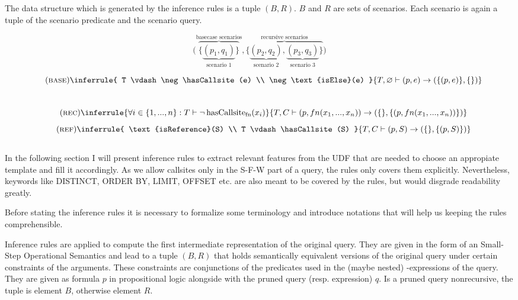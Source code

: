 The data structure which is generated by the inference rules is a tuple $(B, R)$. $B$ and $R$ are sets of scenarios. Each scenario is again a tuple of the scenario predicate and the scenario query.

$$
\Big(
    \overbrace{\big\{
        \underbrace{
            (p_1, q_1)
        }_{\text{scenario 1}}
    \big\}}^{\text{basecase scenarios}}
    ,
    \overbrace{\big\{
        \underbrace{
            (p_2, q_2)
        }_{\text{scenario 2}},
        \underbrace{
            (p_3, q_3)
        }_{\text{scenario 3}}
    \big\}}^{\text{recursive scenarios}}
\Big)
$$


$$\quad(\textsc{base})\inferrule{
   T \vdash \neg \hasCallsite(e) \\
   \neg \text{isElse}(e)
}{
    T, \varnothing \vdash (p, e) \rightarrow (\{(p, e)\},\{\})
}$$
\\
$$\quad(\textsc{rec})\inferrule{
   \forall i \in \{1, ..., n\} : T \vdash \neg \hasCallsite(x_i)
}{
    T, C \vdash (p, fn(x_1, ..., x_n)) \rightarrow (\{\}, \{(p, fn(x_1, ..., x_n))\})
}$$
$$\quad(\textsc{ref})\inferrule{
   \text{isReference}(S) \\
   T \vdash \hasCallsite(S)
}{
    T, C \vdash (p, S) \rightarrow (\{\}, \{(p, S)\})
}$$
\\

In the following section I will present inference rules to extract relevant features from the UDF that are needed to choose an appropiate template and fill it accordingly. As we allow callsites only in the S-F-W part of a query, the rules only covers them explicitly. Nevertheless, keywords like DISTINCT, ORDER BY, LIMIT, OFFSET etc. are also meant to be covered by the rules, but would disgrade readability greatly.

Before stating the inference rules it is necessary to formalize some terminology and introduce notations that will help us keeping the rules comprehensible.


Inference rules are applied to compute the first intermediate representation of the original query. They are given in the form of an Small-Step Operational Semantics and lead to a tuple $(B, R)$ that holds semantically equivalent versions of the original query under certain constraints of the arguments. These constraints are conjunctions of the predicates used in the (maybe nested) \CASE-expressions of the query. They are given as formula $p$ in propositional logic alongside with the pruned query (resp. expression) $q$. Is a pruned query nonrecursive, the tuple is element $B$, otherwise element $R$.
\\\\

